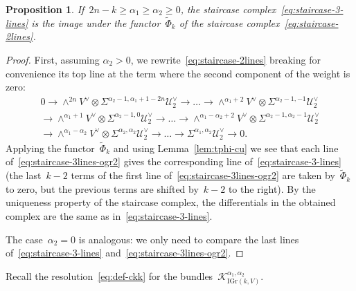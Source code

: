\documentclass[a4paper]{article}
\newcommand{\IGr}{\mathrm{IGr}}
\newcommand{\cK}{\mathcal{K}}
\newcommand{\cU}{\mathcal{U}}
\newtheorem{proposition}[theorem]{Proposition}
\theoremstyle{remark}
\theoremstyle{definition}
\begin{document}
\begin{proposition}
\label{prop:thpi-staircase}
If~\(2n - k \ge \alpha_1 \ge \alpha_2 \ge 0\), the staircase complex~\eqref{eq:staircase-3-lines} 
is the image under the functor~\(\tilde\Phi_k\)
of the staircase complex~\eqref{eq:staircase-2lines}.
\end{proposition}

\begin{proof}
First, assuming \(\alpha_2 > 0\), we rewrite~\eqref{eq:staircase-2lines} breaking for convenience its top line at the term where the second component of the weight is zero:
\begin{multline}
\label{eq:staircase-3lines-ogr2}
0 \to 
\wedge^{2n}V^\vee \otimes \Sigma^{\alpha_2-1,\alpha_1+1-2n}\cU_2^\vee \to
\dots \to
\wedge^{\alpha_1+2}V^\vee \otimes \Sigma^{\alpha_2-1,-1}\cU_2^\vee \\ \to
\wedge^{\alpha_1+1}V^\vee \otimes \Sigma^{\alpha_2-1,0}\cU_2^\vee \to
\dots \to
\wedge^{\alpha_1-\alpha_2+2}V^\vee \otimes \Sigma^{\alpha_2-1,\alpha_2-1}\cU_2^\vee \\ \to
\wedge^{\alpha_1-\alpha_2}V^\vee \otimes \Sigma^{\alpha_2,\alpha_2}\cU_2^\vee \to
\dots \to
\Sigma^{\alpha_1,\alpha_2}\cU_2^\vee \to 0.
\end{multline}
Applying the functor~\(\tilde\Phi_k\) and using Lemma~\ref{lem:tphi-cu} 
we see that each line of~\eqref{eq:staircase-3lines-ogr2} gives the corresponding line of~\eqref{eq:staircase-3-lines}
(the last~\(k - 2\) terms of the first line of~\eqref{eq:staircase-3lines-ogr2} are taken by~\(\tilde\Phi_k\) to zero, 
but the previous terms are shifted by~\(k - 2\) to the right).
By the uniqueness property of the staircase complex, the differentials in the obtained complex are the same as in~\eqref{eq:staircase-3-lines}.

The case~\(\alpha_2 = 0\) is analogous: we only need to compare the last lines of~\eqref{eq:staircase-3-lines} and~\eqref{eq:staircase-3lines-ogr2}.
\end{proof}


Recall the resolution~\eqref{eq:def-ckk} for the bundles~\(\cK_{\IGr(k,V)}^{\alpha_1,\alpha_2}\).
\end{document}
